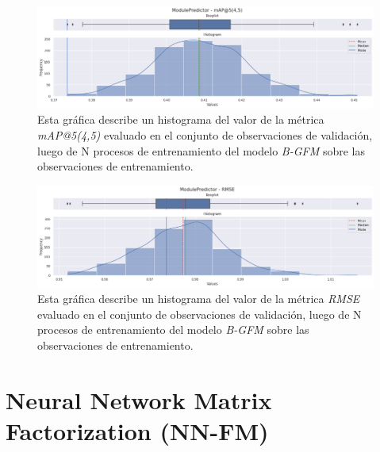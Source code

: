 \documentclass[11pt,a4paper,twoside]{thesis}
\begin{document}
{\begin{figure}[h!]
	\centering
	\includegraphics[width=15cm]{./images/metrics-BGFM-mapk.png}
	\caption{Esta gráfica describe un histograma del valor de la métrica \textit{mAP@5(4,5)} evaluado en el conjunto de observaciones de validación, luego de N procesos de entrenamiento del modelo \textit{B-GFM} sobre las observaciones de entrenamiento.}
\end{figure}


\clearpage

\begin{figure}[h!]
	\centering
	\includegraphics[width=15cm]{./images/metrics-BGFM-RMSE.png}
	\caption{Esta gráfica describe un histograma del valor de la métrica \textit{RMSE} evaluado en el conjunto de observaciones de validación, luego de N procesos de entrenamiento del modelo \textit{B-GFM} sobre las observaciones de entrenamiento.}
\end{figure}




\section{Neural Network Matrix Factorization (NN-FM)}

}
\end{document}
